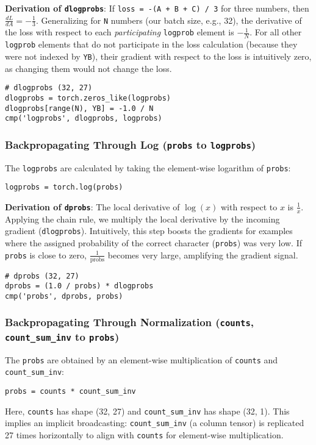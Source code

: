 \textbf{Derivation of \texttt{dlogprobs}}:
If \texttt{loss = -(A + B + C) / 3} for three numbers, then $\frac{dL}{dA} = -\frac{1}{3}$.
Generalizing for \texttt{N} numbers (our batch size, e.g., 32), the derivative of the loss with respect to each \textit{participating} \texttt{logprob} element is $-\frac{1}{N}$.
For all other \texttt{logprob} elements that do not participate in the loss calculation (because they were not indexed by \texttt{YB}), their gradient with respect to the loss is intuitively zero, as changing them would not change the loss.

\begin{lstlisting}[caption={Calculating dlogprobs}]
# dlogprobs (32, 27)
dlogprobs = torch.zeros_like(logprobs)
dlogprobs[range(N), YB] = -1.0 / N
cmp('logprobs', dlogprobs, logprobs)
\end{lstlisting}

\subsubsection{Backpropagating Through Log (\texttt{probs} to \texttt{logprobs})}
The \texttt{logprobs} are calculated by taking the element-wise logarithm of \texttt{probs}:
\begin{lstlisting}[caption={Logprobs Calculation}]
logprobs = torch.log(probs)
\end{lstlisting}

\textbf{Derivation of \texttt{dprobs}}:
The local derivative of $\log(x)$ with respect to $x$ is $\frac{1}{x}$. Applying the chain rule, we multiply the local derivative by the incoming gradient (\texttt{dlogprobs}).
Intuitively, this step boosts the gradients for examples where the assigned probability of the correct character (\texttt{probs}) was very low. If \texttt{probs} is close to zero, $\frac{1}{\text{probs}}$ becomes very large, amplifying the gradient signal.

\begin{lstlisting}[caption={Calculating dprobs}]
# dprobs (32, 27)
dprobs = (1.0 / probs) * dlogprobs
cmp('probs', dprobs, probs)
\end{lstlisting}

\subsubsection{Backpropagating Through Normalization (\texttt{counts}, \texttt{count\_sum\_inv} to \texttt{probs})}
The \texttt{probs} are obtained by an element-wise multiplication of \texttt{counts} and \texttt{count\_sum\_inv}:
\begin{lstlisting}[caption={Probabilities Calculation}]
probs = counts * count_sum_inv
\end{lstlisting}
Here, \texttt{counts} has shape (32, 27) and \texttt{count\_sum\_inv} has shape (32, 1). This implies an implicit broadcasting: \texttt{count\_sum\_inv} (a column tensor) is replicated 27 times horizontally to align with \texttt{counts} for element-wise multiplication.

